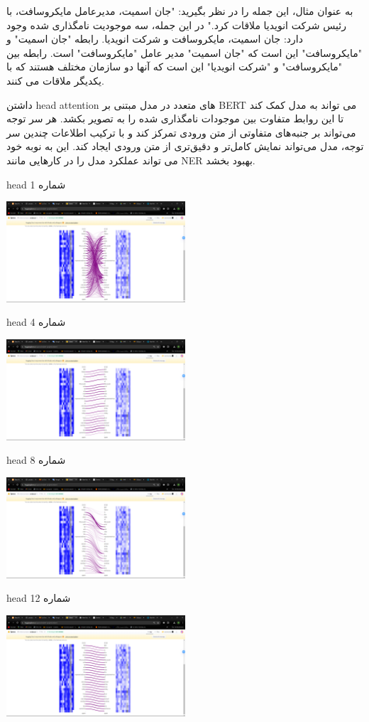 \documentclass{article}
\begin{document}
به عنوان مثال، این جمله را در نظر بگیرید: "جان اسمیت، مدیرعامل مایکروسافت، با رئیس شرکت انویدیا ملاقات کرد." در این جمله، سه موجودیت نامگذاری شده وجود دارد: جان اسمیت، مایکروسافت و شرکت انویدیا. رابطه "جان اسمیت" و "مایکروسافت" این است که "جان اسمیت" مدیر عامل "مایکروسافت" است. رابطه بین "مایکروسافت" و "شرکت انویدیا" این است که آنها دو سازمان مختلف هستند که با یکدیگر ملاقات می کنند.

داشتن head attention های متعدد در مدل مبتنی بر BERT می تواند به مدل کمک کند تا این روابط متفاوت بین موجودات نامگذاری شده را به تصویر بکشد. هر سر توجه می‌تواند بر جنبه‌های متفاوتی از متن ورودی تمرکز کند و با ترکیب اطلاعات چندین سر توجه، مدل می‌تواند نمایش کامل‌تر و دقیق‌تری از متن ورودی ایجاد کند. این به نوبه خود می تواند عملکرد مدل را در کارهایی مانند NER بهبود بخشد. 

\singlespacing
head شماره 1 

\includegraphics[width=0.5\textwidth]{188}\par\vspace{1cm}

\singlespacing
head شماره 4 

\includegraphics[width=0.5\textwidth]{189}\par\vspace{1cm}

head شماره 8 


\includegraphics[width=0.5\textwidth]{190}\par\vspace{1cm}

head شماره 12 


\includegraphics[width=0.5\textwidth]{191}\par\vspace{1cm}


\singlespacing


\end{document}
